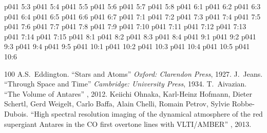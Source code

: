 \vs p041 5:3 
\vs p041 5:4 
\vs p041 5:5 
\vs p041 5:6 \pc 
\vs p041 5:7 \pc 
\vs p041 5:8 
\vs p041 6:1 
\vs p041 6:2 
\vs p041 6:3 \pc 
\vs p041 6:4 
\vs p041 6:5 
\vs p041 6:6 \pc 
\vs p041 6:7 \pc 
{}
\vs p041 7:1 
\vs p041 7:2 
\vs p041 7:3 \pc 
\vs p041 7:4 
\vs p041 7:5 
\vs p041 7:6 
\vs p041 7:7 
\vs p041 7:8 
\vs p041 7:9 
\vs p041 7:10 
\vs p041 7:11 \pc 
\vs p041 7:12 \pc 
\vs p041 7:13 
\vs p041 7:14 \pc 
\vs p041 7:15 
\vs p041 8:1 
\vs p041 8:2 \pc 
\vs p041 8:3 \pc 
\vs p041 8:4 
\vs p041 9:1 
\vs p041 9:2 \pc 
\vs p041 9:3 \pc 
\vs p041 9:4 
\vs p041 9:5 
\vs p041 10:1 
\vs p041 10:2 
\vs p041 10:3 \pc 
\vs p041 10:4 
\vs p041 10:5 \pc 
\vsetoff
\vs p041 10:6 
\quizlink
\begin{thebibliography}{100}
A.S.~Eddington.
{``Stars and Atoms''}
{\em Oxford: Clarendon Press}, 1927.
J.~Jeans.
{``Through Space and Time''}
{\em Cambridge: University Press}, 1934.
T.~Aivazian.
{``The Volume of Antares''}
{\em {}}, 2012.
Keiichi Ohnaka, Karl-Heinz Hofmann, Dieter Schertl, Gerd Weigelt, Carlo Baffa, Alain Chelli, Romain Petrov, Sylvie Robbe-Dubois.
{``High spectral resolution imaging of the dynamical atmosphere of the red supergiant Antares in the CO first overtone lines with VLTI/AMBER''}
{\em {}}, 2013.
\end{thebibliography}
